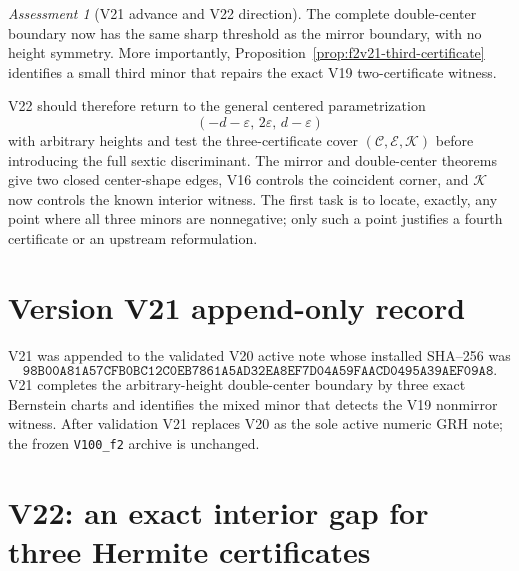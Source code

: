 \documentclass[11pt]{article}
\theoremstyle{definition}
\theoremstyle{remark}
\newtheorem{assessment}[theorem]{Assessment}
\begin{document}
\begin{assessment}[V21 advance and V22 direction]
\label{ass:f2v21}
The complete double-center boundary now has the same sharp threshold as the
mirror boundary, with no height symmetry.  More importantly,
Proposition~\ref{prop:f2v21-third-certificate} identifies a small third
minor that repairs the exact V19 two-certificate witness.

V22 should therefore return to the general centered parametrization
\[
 (-d-\varepsilon,\,2\varepsilon,\,d-\varepsilon)
 \tag{N21.32}
\]
with arbitrary heights and test the three-certificate cover
\((\mathcal C,\mathcal E,\mathcal K)\) before introducing the full sextic
discriminant.  The mirror and double-center theorems give two closed
center-shape edges, V16 controls the coincident corner, and
\(\mathcal K\) now controls the known interior witness.  The first task is
to locate, exactly, any point where all three minors are nonnegative; only
such a point justifies a fourth certificate or an upstream reformulation.
\end{assessment}

\section*{Version V21 append-only record}

V21 was appended to the validated V20 active note whose installed SHA--256
was
\[
 \texttt{98B00A81A57CFB0BC12C0EB7861A5AD32EA8EF7D04A59FAACD0495A39AEF09A8}.
 \tag{N21.33}
\]
V21 completes the arbitrary-height double-center boundary by three exact
Bernstein charts and identifies the mixed minor that detects the V19
nonmirror witness.  After validation V21 replaces V20 as the sole active
numeric GRH note; the frozen \texttt{V100\_f2} archive is unchanged.



\section{V22: an exact interior gap for three Hermite certificates}
\label{sec:f2v22-interior-gap}
\end{document}
